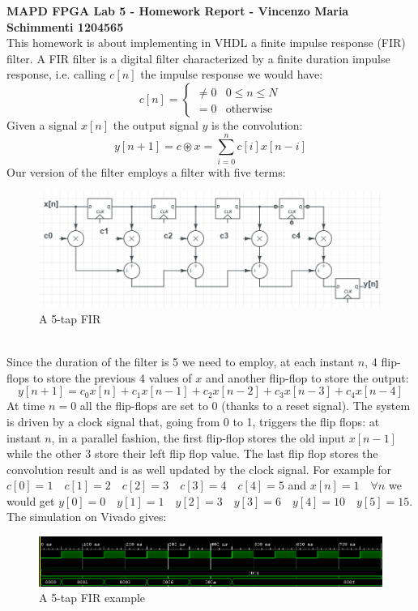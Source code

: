 \documentclass[a4paper,12pt]{report}
\begin{document}
{\textbf{MAPD FPGA Lab 5 - Homework Report - Vincenzo Maria Schimmenti 1204565}}\\
This homework is about implementing in VHDL a finite impulse response (FIR) filter. A FIR filter is a digital filter characterized by a finite duration impulse response, i.e. calling
$c[n]$ the impulse response we would have:
$$c[n]=\begin{cases}
\neq 0 & 0 \leq n \leq N \\
= 0 & \textrm{otherwise}
\end{cases}$$
Given a signal $x[n]$ the output signal $y$ is the convolution:
$$y[n+1]=c \circledast x = \sum_{i=0}^{n} c[i]x[n-i]$$
Our version of the filter employs a filter with five terms:\\
\begin{figure}[h!]
	\includegraphics[width=\linewidth]{fir5.png}
	\caption{A 5-tap FIR}
	\label{fig:fir5}
\end{figure}\\
Since the duration of the filter is 5 we need to employ, at each instant $n$, 4 flip-flops to store the previous 4 values of $x$ and another flip-flop to store the output:
$$y[n+1]=c_0 x[n] + c_1x[n-1]+c_2x[n-2]+c_3x[n-3] + c_4x[n-4]$$
At time $n=0$ all the flip-flops are set to $0$ (thanks to a reset signal). The system is driven by a clock signal that, going from 0 to 1, triggers the flip flops: at instant $n$, in a parallel fashion, the first flip-flop stores the old input $x[n-1]$ while the other 3 store their left flip flop value. The last flip flop stores the convolution result and is as well updated by the clock signal.
\newpage
For example for $c[0]=1 \quad c[1]=2 \quad c[2]=3 \quad c[3]=4 \quad c[4]=5$ and $x[n]=1 \quad \forall n$ we would get $y[0]=0\quad y[1]=1 \quad y[2] =3 \quad y[3] = 6 \quad y[4] = 10 \quad y[5]=15$. The simulation on Vivado gives:
\begin{figure}[h!]
	\begin{center}
		\includegraphics[width=1.2\textwidth,keepaspectratio]{fir5ex.png}
	\end{center}	
	\caption{A 5-tap FIR example}
	\label{fig:fir5ex}
\end{figure}\\
\end{document}
